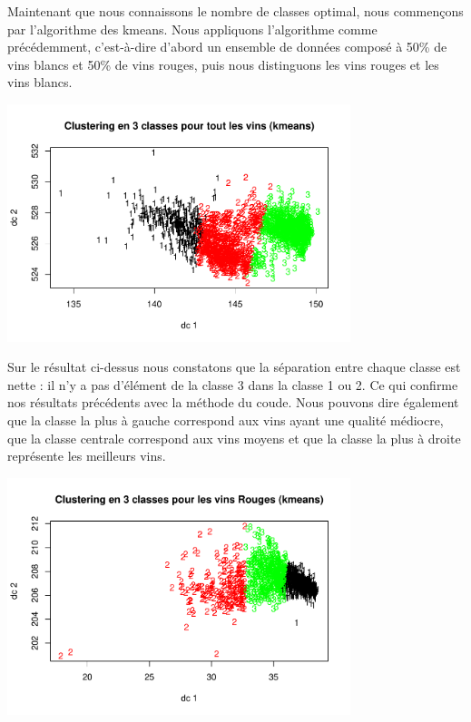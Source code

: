 \documentclass[
]{article}
\begin{document}
Maintenant que nous connaissons le nombre de classes optimal, nous
commençons par l'algorithme des kmeans. Nous appliquons l'algorithme
comme précédemment, c'est-à-dire d'abord un ensemble de données composé
à 50\% de vins blancs et 50\% de vins rouges, puis nous distinguons les
vins rouges et les vins blancs.

\begin{center}
	\includegraphics[width=10cm]{repport_files/figure-latex/unnamed-chunk-7-1.pdf}
\end{center}

Sur le résultat ci-dessus nous constatons que la séparation entre chaque
classe est nette : il n'y a pas d'élément de la classe 3 dans la classe
1 ou 2. Ce qui confirme nos résultats précédents avec la méthode du
coude. Nous pouvons dire également que la classe la plus à gauche
correspond aux vins ayant une qualité médiocre, que la classe centrale
correspond aux vins moyens et que la classe la plus à droite représente
les meilleurs vins.

\begin{center}
	\includegraphics[width=10cm]{repport_files/figure-latex/unnamed-chunk-8-1.pdf}
\end{center}
\end{document}
